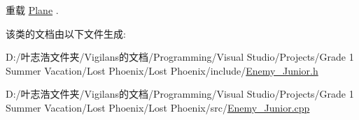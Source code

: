 重载 \hyperlink{class_plane_a7fbb07f76503fe057772e01f542afc32}{Plane} .



该类的文档由以下文件生成\+:\begin{DoxyCompactItemize}
\item 
D\+:/叶志浩文件夹/\+Vigilans的文档/\+Programming/\+Visual Studio/\+Projects/\+Grade 1 Summer Vacation/\+Lost Phoenix/\+Lost Phoenix/include/\hyperlink{_enemy___junior_8h}{Enemy\+\_\+\+Junior.\+h}\item 
D\+:/叶志浩文件夹/\+Vigilans的文档/\+Programming/\+Visual Studio/\+Projects/\+Grade 1 Summer Vacation/\+Lost Phoenix/\+Lost Phoenix/src/\hyperlink{_enemy___junior_8cpp}{Enemy\+\_\+\+Junior.\+cpp}\end{DoxyCompactItemize}
